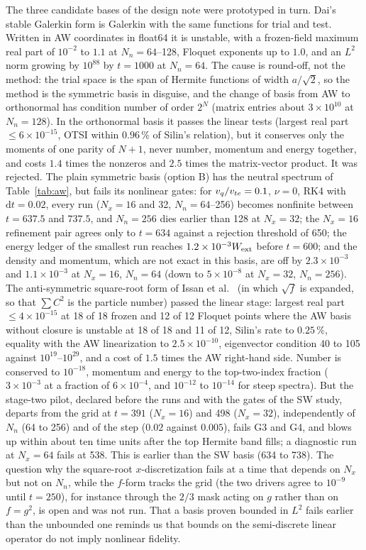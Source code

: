 The three candidate bases of the design note were prototyped in turn. Dai's stable Galerkin form is Galerkin with the same functions for trial and test. Written in AW coordinates in float64 it is unstable, with a frozen-field maximum real part of $10^{-2}$ to $1.1$ at $N_n=64$--128, Floquet exponents up to $1.0$, and an $L^2$ norm growing by $10^{88}$ by $t=1000$ at $N_n=64$. The cause is round-off, not the method: the trial space is the span of Hermite functions of width $a/\sqrt2$, so the method is the symmetric basis in disguise, and the change of basis from AW to orthonormal has condition number of order $2^N$ (matrix entries about $3\times10^{10}$ at $N_n=128$). In the orthonormal basis it passes the linear tests (largest real part $\le6\times10^{-15}$, OTSI within $0.96\,\%$ of Silin's relation), but it conserves only the moments of one parity of $N+1$, never number, momentum and energy together, and costs $1.4$ times the nonzeros and $2.5$ times the matrix-vector product. It was rejected. The plain symmetric basis (option B) has the neutral spectrum of Table~\ref{tab:aw}, but fails its nonlinear gates: for $v_q/v_{te}=0.1$, $\nu=0$, RK4 with $\mathrm dt=0.02$, every run ($N_x=16$ and 32, $N_n=64$--256) becomes nonfinite between $t=637.5$ and $737.5$, and $N_n=256$ dies earlier than 128 at $N_x=32$; the $N_x=16$ refinement pair agrees only to $t=634$ against a rejection threshold of 650; the energy ledger of the smallest run reaches $1.2\times10^{-3}W_{\rm ext}$ before $t=600$; and the density and momentum, which are not exact in this basis, are off by $2.3\times10^{-3}$ and $1.1\times10^{-3}$ at $N_x=16$, $N_n=64$ (down to $5\times10^{-8}$ at $N_x=32$, $N_n=256$). The anti-symmetric square-root form of Issan et al.~\cite{Issan2024a,Issan2025} (in which $\sqrt f$ is expanded, so that $\sum C^2$ is the particle number) passed the linear stage: largest real part $\le4\times10^{-15}$ at 18 of 18 frozen and 12 of 12 Floquet points where the AW basis without closure is unstable at 18 of 18 and 11 of 12, Silin's rate to $0.25\,\%$, equality with the AW linearization to $2.5\times10^{-10}$, eigenvector condition 40 to 105 against $10^{19}$--$10^{29}$, and a cost of $1.5$ times the AW right-hand side. Number is conserved to $10^{-18}$, momentum and energy to the top-two-index fraction ($3\times10^{-3}$ at a fraction of $6\times10^{-4}$, and $10^{-12}$ to $10^{-14}$ for steep spectra). But the stage-two pilot, declared before the runs and with the gates of the SW study, departs from the grid at $t=391$ ($N_x=16$) and 498 ($N_x=32$), independently of $N_n$ (64 to 256) and of the step ($0.02$ against $0.005$), fails G3 and G4, and blows up within about ten time units after the top Hermite band fills; a diagnostic run at $N_x=64$ fails at 538. This is earlier than the SW basis (634 to 738). The question why the square-root $x$-discretization fails at a time that depends on $N_x$ but not on $N_n$, while the $f$-form tracks the grid (the two drivers agree to $10^{-9}$ until $t=250$), for instance through the $2/3$ mask acting on $g$ rather than on $f=g^2$, is open and was not run. That a basis proven bounded in $L^2$ fails earlier than the unbounded one reminds us that bounds on the semi-discrete linear operator do not imply nonlinear fidelity.

